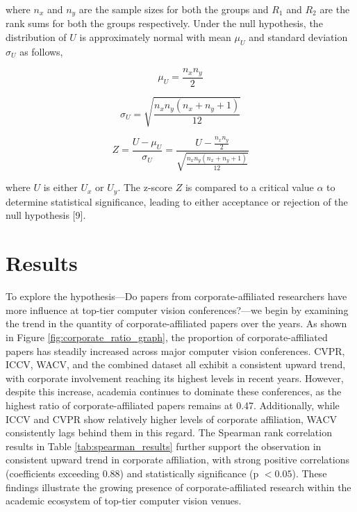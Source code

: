 \documentclass{article}
\begin{document}
where $n_x$ and $n_y$ are the sample sizes for both the groups and $R_1$ and $R_2$ are the rank sums for both the groups respectively. Under the null hypothesis, the distribution of \( U \) is approximately normal with mean $\mu_U$ and standard deviation $\sigma_U$ as follows,

\begin{equation}
    \mu_U = \frac{n_x n_y}{2}
\end{equation}


\begin{equation}
    \sigma_U = \sqrt{\frac{n_x n_y (n_x + n_y + 1)}{12}}
\end{equation}

\begin{equation}
    Z = \frac{U - \mu_U}{\sigma_U} = \frac{U - \frac{n_x n_y}{2}}{\sqrt{\frac{n_x n_y (n_x + n_y + 1)}{12}}}
\end{equation}

where $U$ is either $U_x$ or $U_y$. The z-score $Z$ is compared to a critical value $\alpha$ to determine statistical significance, leading to either acceptance or rejection of the null hypothesis [9].


\section{Results}
To explore the hypothesis—Do papers from corporate-affiliated researchers have more influence at top-tier computer vision conferences?—we begin by examining the trend in the quantity of corporate-affiliated papers over the years. As shown in Figure \ref{fig:corporate_ratio_graph}, the proportion of corporate-affiliated papers has steadily increased across major computer vision conferences. CVPR, ICCV, WACV, and the combined dataset all exhibit a consistent upward trend, with corporate involvement reaching its highest levels in recent years. However, despite this increase, academia continues to dominate these conferences, as the highest ratio of corporate-affiliated papers remains at 0.47. Additionally, while ICCV and CVPR show relatively higher levels of corporate affiliation, WACV consistently lags behind them in this regard. The Spearman rank correlation results in Table \ref{tab:spearman_results} further support the observation in consistent upward trend in corporate affiliation, with strong positive correlations (coefficients exceeding 0.88) and statistically significance (p $< 0.05$). These findings illustrate the growing presence of corporate-affiliated research within the academic ecosystem of top-tier computer vision venues.
\end{document}
